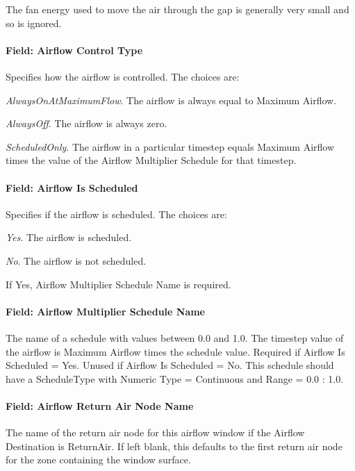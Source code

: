 The fan energy used to move the air through the gap is generally very small and so is ignored.

\paragraph{Field: Airflow Control Type}\label{field-airflow-control-type}

Specifies how the airflow is controlled. The choices are:

\emph{AlwaysOnAtMaximumFlow}. The airflow is always equal to Maximum Airflow.

\emph{AlwaysOff}. The airflow is always zero.

\emph{ScheduledOnly}. The airflow in a particular timestep equals Maximum Airflow times the value of the Airflow Multiplier Schedule for that timestep.

\paragraph{Field: Airflow Is Scheduled}\label{field-airflow-is-scheduled}

Specifies if the airflow is scheduled. The choices are:

\emph{Yes}. The airflow is scheduled.

\emph{No}. The airflow is not scheduled.

If Yes, Airflow Multiplier Schedule Name is required.

\paragraph{Field: Airflow Multiplier Schedule Name}\label{field-airflow-multiplier-schedule-name}

The name of a schedule with values between 0.0 and 1.0. The timestep value of the airflow is Maximum Airflow times the schedule value. Required if Airflow Is Scheduled = Yes. Unused if Airflow Is Scheduled = No. This schedule should have a ScheduleType with Numeric Type = Continuous and Range = 0.0 : 1.0.

\paragraph{Field: Airflow Return Air Node Name}\label{field-airflow-return-air-node-name}

The name of the return air node for this airflow window if the Airflow Destination is ReturnAir. If left blank, this defaults to the first return air node for the zone containing the window surface.

